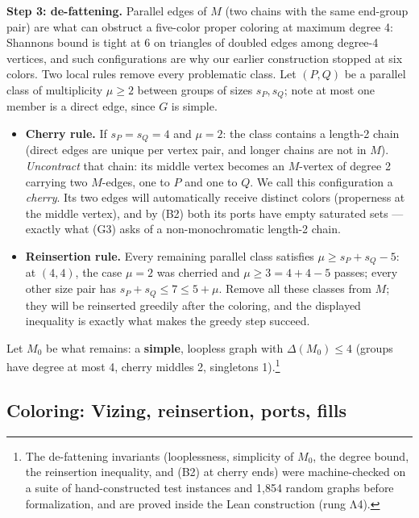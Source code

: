 \documentclass[11pt]{article}
\theoremstyle{definition}
\theoremstyle{remark}
\providecommand{\tightlist}{\setlength{\itemsep}{0pt}\setlength{\parskip}{0pt}}
\begin{document}
\textbf{Step 3: de-fattening.} Parallel edges of \(M\) (two chains with the same end-group pair) are what can obstruct a five-color proper coloring at maximum degree 4: Shannon\textquotesingle s bound \cite{Sha} is tight at 6 on triangles of doubled edges among degree-4 vertices, and such configurations are why our earlier construction stopped at six colors. Two local rules remove every problematic class. Let \((P, Q)\) be a parallel class of multiplicity \(\mu \ge 2\) between groups of sizes \(s_P, s_Q\); note at most one member is a direct edge, since \(G\) is simple.

\begin{itemize}
\tightlist
\item
  \textbf{Cherry rule.} If \(s_P = s_Q = 4\) and \(\mu = 2\): the class contains a length-2 chain (direct edges are unique per vertex pair, and longer chains are not in \(M\)). \emph{Uncontract} that chain: its middle vertex becomes an \(M\)-vertex of degree 2 carrying two \(M\)-edges, one to \(P\) and one to \(Q\). We call this configuration a \emph{cherry}. Its two edges will automatically receive distinct colors (properness at the middle vertex), and by (B2) both its ports have empty saturated sets --- exactly what (G3) asks of a non-monochromatic length-2 chain.
\item
  \textbf{Reinsertion rule.} Every remaining parallel class satisfies \(\mu \ge s_P + s_Q - 5\): at \((4,4)\), the case \(\mu = 2\) was cherried and \(\mu \ge 3 = 4 + 4 - 5\) passes; every other size pair has \(s_P + s_Q \le 7 \le 5 + \mu\). Remove all these classes from \(M\); they will be reinserted greedily after the coloring, and the displayed inequality is exactly what makes the greedy step succeed.
\end{itemize}

Let \(M_0\) be what remains: a \textbf{simple}, loopless graph with \(\Delta(M_0) \le 4\) (groups have degree at most 4, cherry middles 2, singletons 1).\footnote{The de-fattening invariants (looplessness, simplicity of \(M_0\), the degree bound, the reinsertion inequality, and (B2) at cherry ends) were machine-checked on a suite of hand-constructed test instances and 1,854 random graphs before formalization, and are proved inside the Lean construction (rung Λ4).}

\subsection{Coloring: Vizing, reinsertion, ports, fills}\label{24-coloring-vizing-reinsertion-ports-fills}
\end{document}
